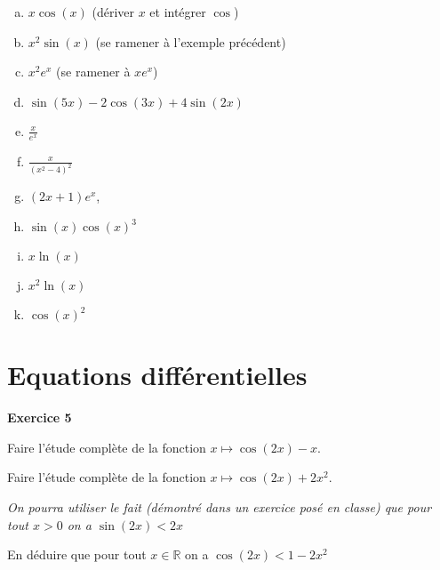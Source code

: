 ﻿\documentclass[11pt,a4paper]{amsart}
\theoremstyle{theorem}
\theoremstyle{definition}
\def\RR{{\mathbb R}}
\newcounter{qcounter}
\newcounter{qscounter}
\begin{document}
\begin{multicols}{2}
\begin{enumerate}[a)]
\item $x\cos(x)$ (dériver $x$ et intégrer $\cos$)
\item $x^2\sin(x)$ (se ramener à l'exemple précédent)
\item $x^2e^x$ (se ramener à $xe^x$)
\item $\sin(5x)-2\cos(3x)+4\sin(2x)$ 
\item $\frac{x}{e^x}$
\item $\frac{x}{(x^2-4)^2}$
\item $(2x+1)e^x$,
\item $\sin(x)\cos(x)^3$
\item $x\ln(x)$
\item $x^2\ln(x)$
\item $\cos(x)^2$
\end{enumerate}
\end{multicols}

\section{Equations différentielles}

\setcounter{qcounter}{0} \setcounter{qscounter}{0}\textbf{Exercice 5}

\question 
Faire l'étude complète de la fonction $x\mapsto \cos(2x)-x$.


\question 
Faire l'étude complète de la fonction $x\mapsto \cos(2x)+2x^2$. 

\textit{On pourra utiliser le fait (démontré dans un exercice posé en classe) que pour tout $x>0$ on a $\sin(2x)<2x$}

\question En déduire que pour tout $x\in\RR$ on a $\cos(2x)<1-2x^2$
\end{document}
